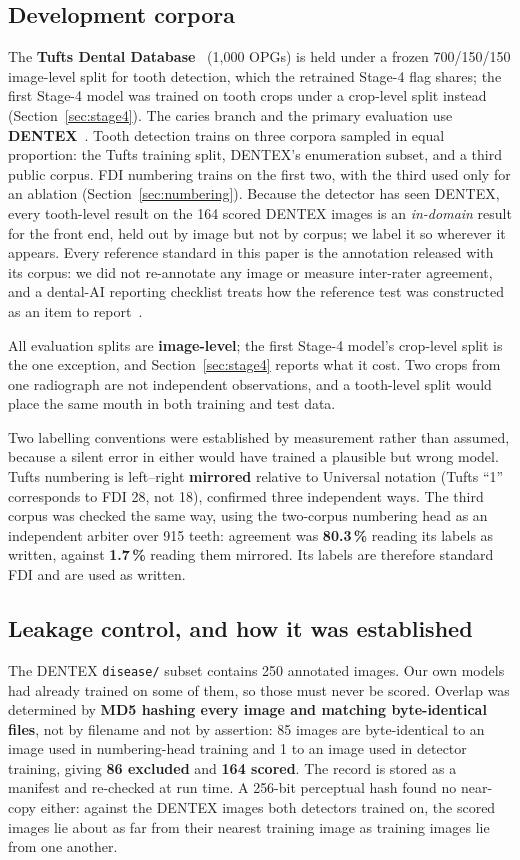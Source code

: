 \documentclass[conference]{IEEEtran}
\begin{document}
\subsection{Development corpora}
The \textbf{Tufts Dental Database}~\cite{panetta2022tufts} (1{,}000 OPGs) is
held under a frozen 700/150/150 image-level split for tooth detection, which the
retrained Stage-4 flag shares; the first Stage-4 model was trained on tooth crops
under a crop-level split instead (Section~\ref{sec:stage4}). The caries branch and the primary evaluation use
\textbf{DENTEX}~\cite{hamamci2023dentex}. Tooth detection trains on three
corpora sampled in equal proportion: the Tufts training split, DENTEX's
enumeration subset, and a third public corpus. FDI numbering trains on the first
two, with the third used only for an ablation (Section~\ref{sec:numbering}).
Because the detector has seen DENTEX, every tooth-level result on the 164 scored
DENTEX images is an \emph{in-domain} result for the front end, held out by image
but not by corpus; we label it so wherever it appears. Every reference standard in
this paper is the annotation released with its corpus: we did not re-annotate any
image or measure inter-rater agreement, and a dental-AI reporting checklist treats
how the reference test was constructed as an item to report~\cite{schwendicke2021checklist}.

All evaluation splits are \textbf{image-level}; the first Stage-4 model's
crop-level split is the one exception, and Section~\ref{sec:stage4} reports what it
cost. Two crops from one radiograph are not
independent observations, and a tooth-level split would place the same mouth in
both training and test data.

Two labelling conventions were established by measurement rather than assumed,
because a silent error in either would have trained a plausible but wrong model.
Tufts numbering is left--right \textbf{mirrored} relative to Universal notation
(Tufts ``1'' corresponds to FDI 28, not 18), confirmed three independent ways.
The third corpus was checked the same way, using the two-corpus numbering head as
an independent arbiter over 915 teeth: agreement was \textbf{80.3\,\%} reading
its labels as written, against \textbf{1.7\,\%} reading them mirrored. Its labels
are therefore standard FDI and are used as written.

\subsection{Leakage control, and how it was established}
The DENTEX \texttt{disease/} subset contains 250 annotated images. Our own
models had already trained on some of them, so those must never be scored.
Overlap was determined by \textbf{MD5 hashing every image and matching byte-identical
files}, not by filename and not by assertion: 85 images are byte-identical to an
image used in numbering-head training and 1 to an image used in detector
training, giving \textbf{86 excluded} and \textbf{164 scored}. The record is
stored as a manifest and re-checked at run time. A 256-bit perceptual hash found
no near-copy either: against the DENTEX images both detectors trained on, the
scored images lie about as far from their nearest training image as training
images lie from one another.
\end{document}

